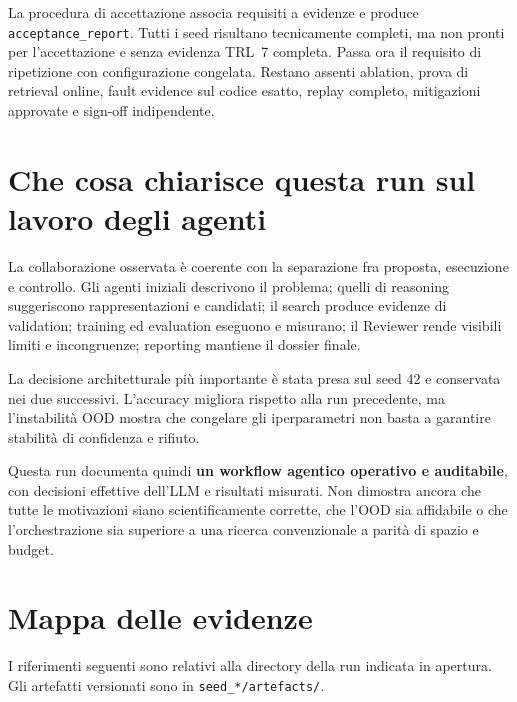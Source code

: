 \documentclass[11pt,a4paper]{article}
\newcommand{\artefatto}[1]{\nolinkurl{#1}}
\newcommand{\file}[1]{\nolinkurl{#1}}
\begin{document}
La procedura di accettazione associa requisiti a evidenze e produce
\artefatto{acceptance_report}. Tutti i seed risultano tecnicamente completi,
ma non pronti per l'accettazione e senza evidenza TRL~7 completa.
Passa ora il requisito di ripetizione con configurazione congelata.
Restano assenti ablation, prova di retrieval online, fault evidence sul
codice esatto, replay completo, mitigazioni approvate e sign-off indipendente.

\section{Che cosa chiarisce questa run sul lavoro degli agenti}

La collaborazione osservata è coerente con la separazione fra proposta,
esecuzione e controllo. Gli agenti iniziali descrivono il problema;
quelli di reasoning suggeriscono rappresentazioni e candidati; il search
produce evidenze di validation; training ed evaluation eseguono e misurano;
il Reviewer rende visibili limiti e incongruenze; reporting mantiene
il dossier finale.

La decisione architetturale più importante è stata presa sul seed 42 e
conservata nei due successivi. L'accuracy migliora rispetto alla run
precedente, ma l'instabilità OOD mostra che congelare gli iperparametri
non basta a garantire stabilità di confidenza e rifiuto.

Questa run documenta quindi \textbf{un workflow agentico operativo e auditabile},
con decisioni effettive dell'LLM e risultati misurati. Non dimostra ancora
che tutte le motivazioni siano scientificamente corrette, che l'OOD sia
affidabile o che l'orchestrazione sia superiore a una ricerca convenzionale
a parità di spazio e budget.

\appendix
\section{Mappa delle evidenze}

I riferimenti seguenti sono relativi alla directory della run indicata
in apertura. Gli artefatti versionati sono in \file{seed_*/artefacts/}.
\end{document}
